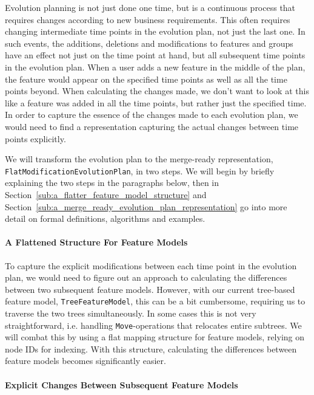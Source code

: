 \documentclass[a4paper,english]{ifimaster}
\begin{document}
Evolution planning is not just done one time, but is a continuous process that requires changes according to new business requirements. This often requires changing intermediate time points in the evolution plan, not just the last one. In such events, the additions, deletions and modifications to features and groups have an effect not just on the time point at hand, but all subsequent time points in the evolution plan. When a user adds a new feature in the middle of the plan, the feature would appear on the specified time points as well as all the time points beyond. When calculating the changes made, we don't want to look at this like a feature was added in all the time points, but rather just the specified time. In order to capture the essence of the changes made to each evolution plan, we would need to find a representation capturing the actual changes between time points explicitly.

We will transform the evolution plan to the merge-ready representation, \texttt{Flat\-Modification\-Evolution\-Plan}, in two steps. We will begin by briefly explaining the two steps in the paragraphs below, then in Section~\vref{sub:a_flatter_feature_model_structure} and Section~\vref{sub:a_merge_ready_evolution_plan_representation} go into more detail on formal definitions, algorithms and examples.

\paragraph{A Flattened Structure For Feature Models}%
\label{par:a_flatter_structure_for_feature_models}

To capture the explicit modifications between each time point in the evolution plan, we would need to figure out an approach to calculating the differences between two subsequent feature models. However, with our current tree-based feature model, \texttt{Tree\-Feature\-Model}, this can be a bit cumbersome, requiring us to traverse the two trees simultaneously. In some cases this is not very straightforward, i.e. handling \texttt{Move}-operations that relocates entire subtrees. We will combat this by using a flat mapping structure for feature models, relying on node IDs for indexing. With this structure, calculating the differences between feature models becomes significantly easier.

\paragraph{Explicit Changes Between Subsequent Feature Models}%
\label{par:explicit_changes_between_subsequent_feature_models}
\end{document}
